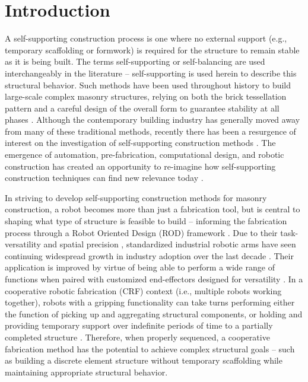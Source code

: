 \newpage
\section{Introduction}\label{intro}
A self-supporting construction process is one where no external support (e.g., temporary scaffolding or formwork) is required for the structure to remain stable as it is being built. The terms self-supporting \cite{deuss_assembling_2014} or self-balancing \cite{paris_statics_2020} are used interchangeably in the literature -- self-supporting is used herein to describe this structural behavior. Such methods have been used throughout history to build large-scale complex masonry structures, relying on both the brick tessellation pattern and a careful design of the overall form to guarantee stability at all phases \cite{choisy_art_1883, el-naggar_les_1999, besenval_technologie_1984, heyman_stone_1997, pizzigoni_brunelleschis_2015, pizzigoni_herringbone_2018, ochsendorf_guastavino_2010}. Although the contemporary building industry has generally moved away from many of these traditional methods, recently there has been a resurgence of interest on the investigation of self-supporting construction methods \cite{vouga_design_2012, deuss_assembling_2014, goessens_feasibility_2018, som_bricks_2019, paris_statics_2020, loing_free-form_2020, drew_lock-block_2021}. The emergence of automation, pre-fabrication, computational design, and robotic construction has created an opportunity to re-imagine how self-supporting construction techniques can find new relevance today \cite{wu_robotic_2018}.

In striving to develop self-supporting construction methods for masonry construction, a robot becomes more than just a fabrication tool, but is central to shaping what type of structure is feasible to build --  informing the fabrication process through a Robot Oriented Design (ROD) framework \cite{bock_robot-oriented_2015}. Due to their task-versatility \cite{bravo-palacios_one_2020} and spatial precision \cite{eversmann_robotic_2017}, standardized industrial robotic arms have seen continuing widespread growth in industry adoption over the last decade \cite{ifr_world_2018}. Their application is improved by virtue of being able to perform a wide range of functions when paired with customized end-effectors designed for versatility \cite{han_concept_2020}. In a cooperative robotic fabrication (CRF) context (i.e., multiple robots working together), robots with a gripping functionality can take turns performing either the function of picking up and aggregating structural components, or holding and providing temporary support over indefinite periods of time to a partially completed structure \cite{parascho_robotic_2020, parascho_lightvault_2021, parascho_cooperative_2017}. Therefore, when properly sequenced, a cooperative fabrication method has the potential to achieve complex structural goals -- such as building a discrete element structure without temporary scaffolding while maintaining appropriate structural behavior.

